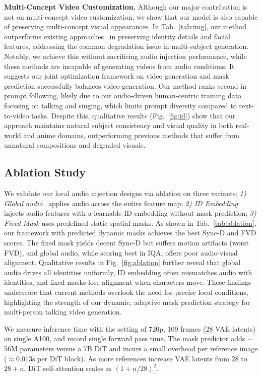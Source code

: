 \documentclass{article} %
\begin{document}
\noindent \textbf{Multi-Concept Video Customization.}
Although our major contribution is not on multi-concept video customization, we show that our model is also capable of preserving multi-concept visual appearances.
In Tab.~\ref{tab:img}, our method outperforms existing approaches~\citep{bao2024vidu,pikaart2024,kuaishou2024} in preserving identity details and facial features, addressing the common degradation issue in multi-subject generation. Notably, we achieve this without sacrificing audio injection performance, while these methods are incapable of generating videos from audio conditions. It suggests our joint optimization framework on video generation and mask prediction successfully balances video generation. Our method ranks second in prompt following, likely due to our audio-driven human-centric training data focusing on talking and singing, which limits prompt diversity compared to text-to-video tasks. Despite this, qualitative results (Fig.~\ref{fig:id}) show that our approach maintains natural subject consistency and visual quality in both real-world and anime domains, outperforming previous methods that suffer from unnatural compositions and degraded visuals.

\subsection{Ablation Study}
We validate our local audio injection designs via ablation on three variants: \emph{1) Global audio}~\citep{lin2025omnihuman} applies audio across the entire feature map;
\emph{2) ID Embedding} injects audio features with a learnable ID embedding without mask prediction;
\emph{3) Fixed Mask} uses predefined static spatial masks.
As shown in Tab.~\ref{tab:ablation}, our framework with predicted dynamic masks achieves the best Sync-D and FVD scores. The fixed mask yields decent Sync-D but suffers motion artifacts (worst FVD), and global audio, while scoring best in IQA, offers poor audio-visual alignment. Qualitative results in Fig.~\ref{fig:ablation} further reveal that global audio drives all identities uniformly, ID embedding often mismatches audio with identities, and fixed masks lose alignment when characters move. These findings underscore that current methods overlook the need for precise local conditions, highlighting the strength of our dynamic, adaptive mask prediction strategy for multi-person talking video generation.




\label{app:runtime}
We measure inference time with the setting of 720p, 109 frames (28 VAE latents) on single A100, and record single forward pass time. The mask predictor adds \(\sim\)56M parameters versus a 7B DiT and incurs a small overhead per reference image (\(\approx\)0.013s per DiT block). As more references increase VAE latents from \(28\) to \(28{+}n\), DiT self-attention scales as \((1{+}n/28)^2\).
\end{document}
